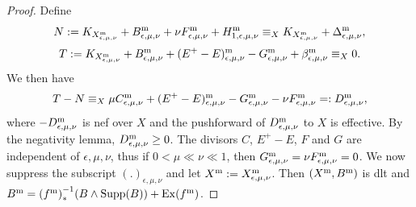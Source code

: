 \documentclass[11pt]{amsart}
\numberwithin{equation}{section}
\def\bbeta{\boldsymbol{\beta}}
\newcommand\R{{\mathbb{R}}}
\theoremstyle{definition}
\theoremstyle{definition}
\theoremstyle{definition}
\begin{document}
\begin{proof}
Define \[N:= K_{X^{\rm m}_{\epsilon, \mu,\nu}}+B_{\epsilon, \mu,\nu}^{\rm m}+\nu F^{\rm m}_{\epsilon, \mu,\nu} + H^{\rm m}_{1,\epsilon, \mu,\nu}\equiv _X K_{X^{\rm m}_{\epsilon, \mu,\nu}}+\Delta_{\epsilon, \mu,\nu}^{\rm m},\]
\[T:=K_{X^{\rm m}_{\epsilon, \mu,\nu}}+B_{\epsilon, \mu,\nu}^{\rm m}+(E^+-E)^{\rm m}_{\epsilon, \mu,\nu}-G^{\rm m}_{\epsilon, \mu,\nu}+\beta ^{\rm m}_{\epsilon, \mu,\nu}\equiv_X 0 .\]
We then have
\[T-N\equiv _X \mu C^{\rm m}_{\epsilon, \mu,\nu}+(E^+-E)^{\rm m}_{\epsilon, \mu,\nu}-G^{\rm m}_{\epsilon, \mu,\nu}-\nu F^{\rm m}_{\epsilon, \mu,\nu}=:D^{\rm m}_{\epsilon, \mu,\nu},\]
where $-D^{\rm m}_{\epsilon, \mu,\nu}$ is nef over $X$ and the pushforward of $D^{\rm m}_{\epsilon, \mu,\nu}$ to $X$ is effective. By the negativity lemma, $D^{\rm m}_{\epsilon, \mu,\nu}\geq 0$.  
The divisors $C$, $E^+-E$, $F$ and $G$ are independent of ${\epsilon, \mu,\nu}$, thus if $0<\mu \ll \nu \ll 1$, then $G^{\rm m}_{\epsilon, \mu,\nu}=\nu F^{\rm m}_{\epsilon, \mu,\nu}=0$. We now suppress the subscript $(.)_{\epsilon, \mu,\nu}$ and let $X^{\rm m}:=X^{\rm m}_{\epsilon, \mu,\nu}$.
Then $(X^{\rm m},B^{\rm m})$ is dlt and $ B^{\rm m}={(f^{\rm m})}^{-1}_*(B\wedge {\rm Supp}(B))+{\rm Ex}(f^{\rm m})$.




\end{proof}
\end{document}
